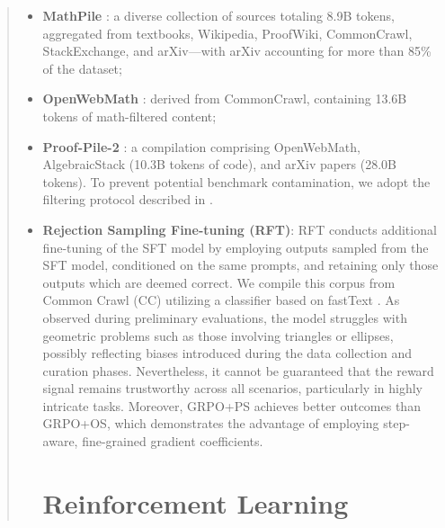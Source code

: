 \begin{itemize}[topsep=0pt]
\begin{itemize}[topsep=0pt]
\begin{itemize}[topsep=0pt]
\begin{abstract}
\begin{itemize}[topsep=0pt]
    \item \textbf{MathPile} \citep{mathpile}: a diverse collection of sources totaling 8.9B tokens, aggregated from textbooks, Wikipedia, ProofWiki, CommonCrawl, StackExchange, and arXiv—with arXiv accounting for more than 85\% of the dataset;
    \item \textbf{OpenWebMath} \citep{openwebmath}: derived from CommonCrawl, containing 13.6B tokens of math-filtered content;
    \item \textbf{Proof-Pile-2} \citep{llemma}: a compilation comprising OpenWebMath, AlgebraicStack (10.3B tokens of code), and arXiv papers (28.0B tokens). To prevent potential benchmark contamination, we adopt the filtering protocol described in \cite{deepseek-coder}. \item \textbf{Rejection Sampling Fine-tuning (RFT)}: RFT conducts additional fine-tuning of the SFT model by employing outputs sampled from the SFT model, conditioned on the same prompts, and retaining only those outputs which are deemed correct. We compile this corpus from Common Crawl (CC) utilizing a classifier based on fastText \citep{joulin2016fasttext}. As observed during preliminary evaluations, the model struggles with geometric problems such as those involving triangles or ellipses, possibly reflecting biases introduced during the data collection and curation phases. Nevertheless, it cannot be guaranteed that the reward signal remains trustworthy across all scenarios, particularly in highly intricate tasks. Moreover, GRPO+PS achieves better outcomes than GRPO+OS, which demonstrates the advantage of employing step-aware, fine-grained gradient coefficients. \section{Reinforcement Learning}


\end{itemize}
\end{abstract}
\end{itemize}
\end{itemize}
\end{itemize}
